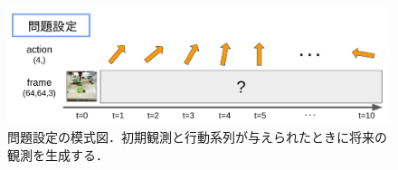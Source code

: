 \begin{figure}[h]
\begin{center}
    \includegraphics[scale=0.25]{./figures/settings.png}
    \caption[問題設定の模式図]{問題設定の模式図．初期観測と行動系列が与えられたときに将来の観測を生成する．}
    \label{fig:settings}
\end{center}
\end{figure}